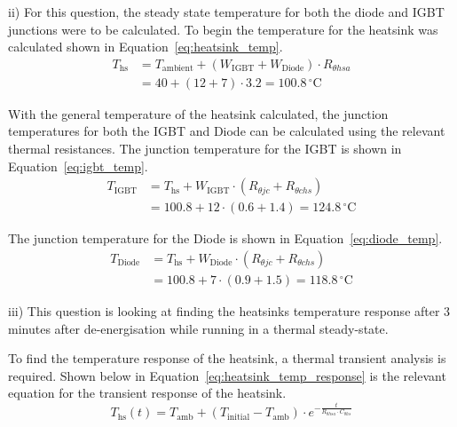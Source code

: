 \documentclass[a4paper, 12pt, titlepage]{report}
\begin{document}
ii) For this question, the steady state temperature for both the diode and IGBT junctions were to be calculated. To begin the temperature for the heatsink was calculated shown in Equation~\ref{eq:heatsink_temp}.
\begin{equation}
    \begin{split}
            T_{\mathrm{hs}} &= T_{\mathrm{ambient}} + (W_{\mathrm{IGBT}} + W_{\mathrm{Diode}}) \cdot R_{\theta hsa} \\
        &= 40 + (12 + 7) \cdot 3.2 = 100.8\,^\circ\mathrm{C}
    \label{eq:heatsink_temp}
    \end{split}
\end{equation}

With the general temperature of the heatsink calculated, the junction temperatures for both the IGBT and Diode can be calculated using the relevant thermal resistances. The junction temperature for the IGBT is shown in Equation~\ref{eq:igbt_temp}.
\begin{equation}
    \begin{split}
        T_{\mathrm{IGBT}} &= T_{\mathrm{hs}} + W_{\mathrm{IGBT}} \cdot (R_{\theta jc} + R_{\theta chs}) \\
        &= 100.8 + 12 \cdot (0.6 + 1.4) = 124.8\,^\circ\mathrm{C}
    \label{eq:igbt_temp}
    \end{split}
\end{equation}   

The junction temperature for the Diode is shown in Equation~\ref{eq:diode_temp}.
\begin{equation}
    \begin{split}
        T_{\mathrm{Diode}} &= T_{\mathrm{hs}} + W_{\mathrm{Diode}} \cdot (R_{\theta jc} + R_{\theta chs}) \\
        &= 100.8 + 7 \cdot (0.9 + 1.5) = 118.8\,^\circ\mathrm{C}
    \label{eq:diode_temp}
    \end{split}
\end{equation}

\vspace{0.5cm}
iii) This question is looking at finding the heatsinks temperature response after 3 minutes after de-energisation while running in a thermal steady-state.

To find the temperature response of the heatsink, a thermal transient analysis is required. Shown below in Equation~\ref{eq:heatsink_temp_response} is the relevant equation for the transient response of the heatsink.
\begin{equation}
    T_{\mathrm{hs}}(t) = T_{\mathrm{amb}} + (T_{\mathrm{initial}} - T_{\mathrm{amb}}) \cdot e^{-\frac{t}{R_{\theta hsa} \cdot C_{\theta hs}}}
    \label{eq:heatsink_temp_response}
\end{equation}
\end{document}
